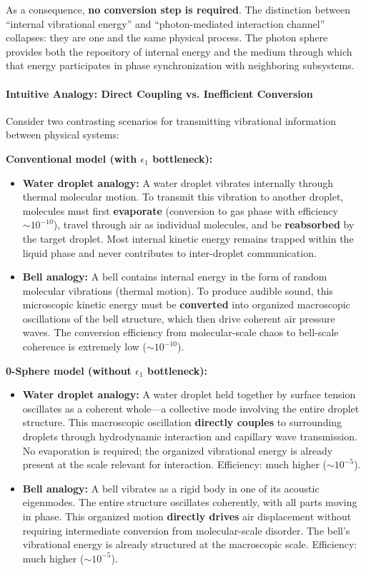 \documentclass[12pt,letterpaper]{article}
\begin{document}
As a consequence, \textbf{no conversion step is required}. The distinction between ``internal vibrational energy'' and ``photon-mediated interaction channel'' collapses: they are one and the same physical process. The photon sphere provides both the repository of internal energy and the medium through which that energy participates in phase synchronization with neighboring subsystems.

\paragraph{Intuitive Analogy: Direct Coupling vs. Inefficient Conversion}

Consider two contrasting scenarios for transmitting vibrational information between physical systems:

\textbf{Conventional model (with $\epsilon_1$ bottleneck):}
\begin{itemize}
\item \textbf{Water droplet analogy:} A water droplet vibrates internally through thermal molecular motion. To transmit this vibration to another droplet, molecules must first \textbf{evaporate} (conversion to gas phase with efficiency $\sim 10^{-10}$), travel through air as individual molecules, and be \textbf{reabsorbed} by the target droplet. Most internal kinetic energy remains trapped within the liquid phase and never contributes to inter-droplet communication.

\item \textbf{Bell analogy:} A bell contains internal energy in the form of random molecular vibrations (thermal motion). To produce audible sound, this microscopic kinetic energy must be \textbf{converted} into organized macroscopic oscillations of the bell structure, which then drive coherent air pressure waves. The conversion efficiency from molecular-scale chaos to bell-scale coherence is extremely low ($\sim 10^{-10}$).
\end{itemize}

\textbf{0-Sphere model (without $\epsilon_1$ bottleneck):}
\begin{itemize}
\item \textbf{Water droplet analogy:} A water droplet held together by surface tension oscillates as a coherent whole—a collective mode involving the entire droplet structure. This macroscopic oscillation \textbf{directly couples} to surrounding droplets through hydrodynamic interaction and capillary wave transmission. No evaporation is required; the organized vibrational energy is already present at the scale relevant for interaction. Efficiency: much higher ($\sim 10^{-5}$).

\item \textbf{Bell analogy:} A bell vibrates as a rigid body in one of its acoustic eigenmodes. The entire structure oscillates coherently, with all parts moving in phase. This organized motion \textbf{directly drives} air displacement without requiring intermediate conversion from molecular-scale disorder. The bell's vibrational energy is already structured at the macroscopic scale. Efficiency: much higher ($\sim 10^{-5}$).
\end{itemize}
\end{document}
